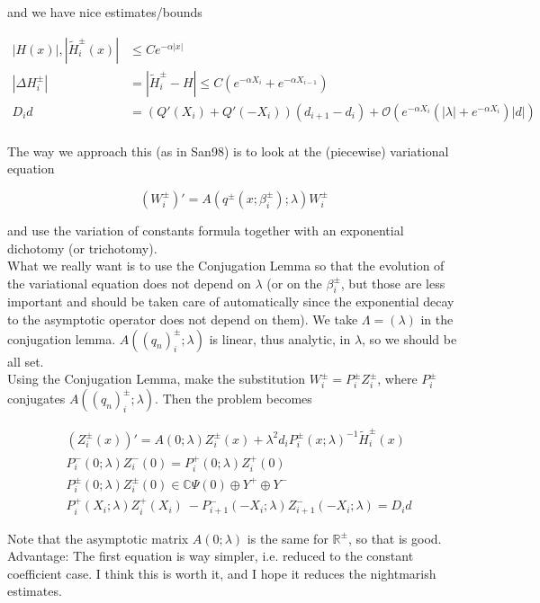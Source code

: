 \documentclass[12pt]{article}
\def\R{{\mathbb R}}
\def\C{{\mathbb C}}
\begin{document}
and we have nice estimates/bounds

\begin{align*}
|H(x)|, |\tilde{H}_i^\pm(x)| &\leq C e^{-\alpha |x|} \\
|\Delta H_i^\pm| &= |\tilde{H}_i^\pm - H| \leq C(e^{-\alpha X_i} + e^{-\alpha X_{i-1}} ) \\
D_i d &= ( Q'(X_i) + Q'(-X_i))(d_{i+1} - d_i ) + \mathcal{O} \left( e^{-\alpha X_i} \left( |\lambda| +  e^{-\alpha X_i}  \right) |d| \right) \\
\end{align*}

The way we approach this (as in San98) is to look at the (piecewise) variational equation

\[
(W_i^\pm)' = A(q^\pm(x; \beta_i^\pm); \lambda) W_i^\pm
\]

and use the variation of constants formula together with an exponential dichotomy (or trichotomy).\\

What we really want is to use the Conjugation Lemma so that the evolution of the variational equation does not depend on $\lambda$ (or on the $\beta_i^\pm$, but those are less important and should be taken care of automatically since the exponential decay to the asymptotic operator does not depend on them). We take $\Lambda = (\lambda)$ in the conjugation lemma. $A((q_n)_i^\pm; \lambda)$ is linear, thus analytic, in $\lambda$, so we should be all set.\\

Using the Conjugation Lemma, make the substitution $W_i^\pm = P_i^\pm Z_i^\pm$, where $P_i^\pm$ conjugates $A((q_n)_i^\pm; \lambda)$. Then the problem becomes

\begin{align*}
&(Z_i^\pm(x))' = A(0; \lambda) Z_i^\pm(x) + \lambda^2 d_i P_i^\pm(x; \lambda)^{-1} \tilde{H}_i^\pm(x) \\
&P_i^-(0; \lambda) Z_i^-(0) = P_i^+(0; \lambda) Z_i^+(0) \\
&P_i^\pm(0; \lambda) Z_i^\pm(0) \in \C \Psi(0) \oplus Y^+ \oplus Y^-\\
&P_i^+(X_i; \lambda) Z_i^+(X_i)\ - P_{i+1}^-(-X_i; \lambda) Z_{i+1}^-(-X_i; \lambda) = D_i d
\end{align*}

Note that the asymptotic matrix $A(0; \lambda)$ is the same for $\R^\pm$, so that is good.\\

Advantage: The first equation is way simpler, i.e. reduced to the constant coefficient case. I think this is worth it, and I hope it reduces the nightmarish estimates.\\
\end{document}
